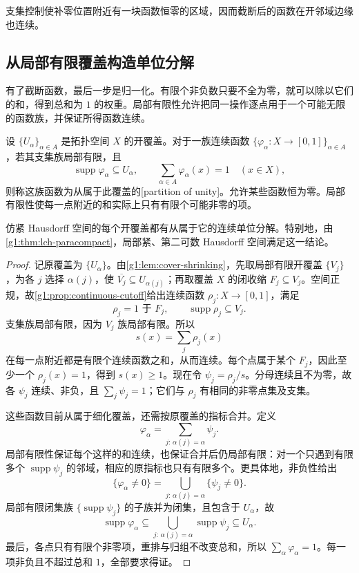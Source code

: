 支集控制使补零位置附近有一块函数恒零的区域，因而截断后的函数在开邻域边缘也连续。

\subsection{从局部有限覆盖构造单位分解}
\label{g1:subsec:0404:03}

有了截断函数，最后一步是归一化。有限个非负数只要不全为零，就可以除以它们的和，得到总和为 \(1\) 的权重。局部有限性允许把同一操作逐点用于一个可能无限的函数族，并保证所得函数连续。

\begin{definition}\label{g1:def:partition-of-unity}
	设 \(\{U_\alpha\}_{\alpha\in A}\) 是拓扑空间 \(X\) 的开覆盖。对于一族连续函数 \(\{\varphi_\alpha:X\rightarrow[0,1]\}_{\alpha\in A}\)，若其支集族局部有限，且
	\[
		\operatorname{supp}\varphi_\alpha\subseteq U_\alpha,\qquad
		\sum_{\alpha\in A}\varphi_\alpha(x)=1\quad(x\in X),
	\]
	则称这族函数为从属于此覆盖的[partition of unity]。允许某些函数恒为零。局部有限性使每一点附近的和实际上只有有限个可能非零的项。
\end{definition}

\begin{theorem}\label{g1:thm:partition-of-unity}
	仿紧 Hausdorff 空间的每个开覆盖都有从属于它的连续单位分解。特别地，由\cref{g1:thm:lch-paracompact}，局部紧、第二可数 Hausdorff 空间满足这一结论。
\end{theorem}
\begin{proof}
	记原覆盖为 \(\{U_\alpha\}\)。由\cref{g1:lem:cover-shrinking}，先取局部有限开覆盖 \(\{V_j\}\)，为各 \(j\) 选择 \(\alpha(j)\)，使 \(\overline{V_j}\subseteq U_{\alpha(j)}\)；再取覆盖 \(X\) 的闭收缩 \(F_j\subseteq V_j\)。空间正规，故\cref{g1:prop:continuous-cutoff}给出连续函数 \(\rho_j:X\rightarrow[0,1]\)，满足
	\[
		\rho_j=1\text{ 于 }F_j,\qquad \operatorname{supp}\rho_j\subseteq V_j.
	\]
	支集族局部有限，因为 \(V_j\) 族局部有限。所以
	\[
		s(x)=\sum_j\rho_j(x)
	\]
	在每一点附近都是有限个连续函数之和，从而连续。每个点属于某个 \(F_j\)，因此至少一个 \(\rho_j(x)=1\)，得到 \(s(x)\ge1\)。现在令 \(\psi_j=\rho_j/s\)。分母连续且不为零，故各 \(\psi_j\) 连续、非负，且 \(\sum_j\psi_j=1\)；它们与 \(\rho_j\) 有相同的非零点集及支集。

	这些函数目前从属于细化覆盖，还需按原覆盖的指标合并。定义
	\[
		\varphi_\alpha=\sum_{j:\,\alpha(j)=\alpha}\psi_j.
	\]
	局部有限性保证每个这样的和连续，也保证合并后仍局部有限：对一个只遇到有限多个 \(\operatorname{supp}\psi_j\) 的邻域，相应的原指标也只有有限多个。更具体地，非负性给出
	\[
		\{\varphi_\alpha\ne0\}=\bigcup_{j:\,\alpha(j)=\alpha}\{\psi_j\ne0\}.
	\]
	局部有限闭集族 \(\{\operatorname{supp}\psi_j\}\) 的子族并为闭集，且包含于 \(U_\alpha\)，故
	\[
		\operatorname{supp}\varphi_\alpha
		\subseteq\bigcup_{j:\,\alpha(j)=\alpha}\operatorname{supp}\psi_j
		\subseteq U_\alpha.
	\]
	最后，各点只有有限个非零项，重排与归组不改变总和，所以 \(\sum_\alpha\varphi_\alpha=1\)。每一项非负且不超过总和 \(1\)，全部要求得证。
\end{proof}

